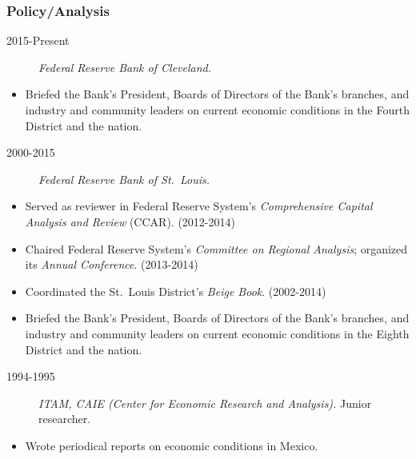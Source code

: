 \documentclass[10pt,]{article}
\def\tightlist{}
\begin{document}
\hypertarget{policyanalysis}{%
\subsubsection{Policy/Analysis}\label{policyanalysis}}

\begin{description}
\tightlist
\item[2015-Present]
\emph{Federal Reserve Bank of Cleveland.}
\end{description}

\begin{itemize}
\tightlist
\item
  Briefed the Bank's President, Boards of Directors of the Bank's
  branches, and industry and community leaders on current economic
  conditions in the Fourth District and the nation.
\end{itemize}

\begin{description}
\tightlist
\item[2000-2015]
\emph{Federal Reserve Bank of St.~Louis.}
\end{description}

\begin{itemize}
\tightlist
\item
  Served as reviewer in Federal Reserve System's \emph{Comprehensive
  Capital Analysis and Review} (CCAR). (2012-2014)
\item
  Chaired Federal Reserve System's \emph{Committee on Regional
  Analysis}; organized its \emph{Annual Conference}. (2013-2014)
\item
  Coordinated the St.~Louis District's \emph{Beige Book}. (2002-2014)
\item
  Briefed the Bank's President, Boards of Directors of the Bank's
  branches, and industry and community leaders on current economic
  conditions in the Eighth District and the nation.
\end{itemize}

\begin{description}
\tightlist
\item[1994-1995]
\emph{ITAM, CAIE (Center for Economic Research and Analysis).} Junior
researcher.
\end{description}

\begin{itemize}
\tightlist
\item
  Wrote periodical reports on economic conditions in Mexico.
\end{itemize}
\end{document}
